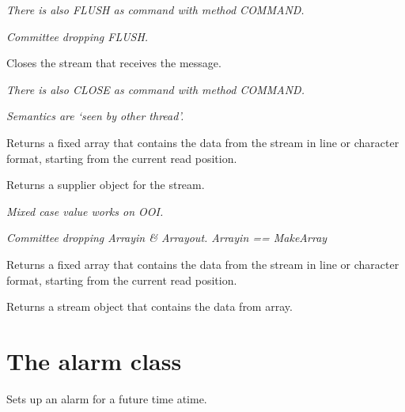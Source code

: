 \emph{There is also FLUSH as command with method COMMAND.}

\emph{Committee dropping FLUSH.}



Closes the stream that receives the message.

\emph{There is also CLOSE as command with method COMMAND.}

\emph{Semantics are `seen by other thread'.}



Returns a fixed array that contains the data from the stream in line or
character format, starting from the current read position.



Returns a supplier object for the stream.





\emph{Mixed case value works on OOI.}

\emph{Committee dropping Arrayin \& Arrayout. Arrayin == MakeArray}

Returns a fixed array that contains the data from the stream in line or
character format, starting from the current read position.



Returns a stream object that contains the data from array.

\section{The alarm class}\label{the-alarm-class}



Sets up an alarm for a future time atime.



